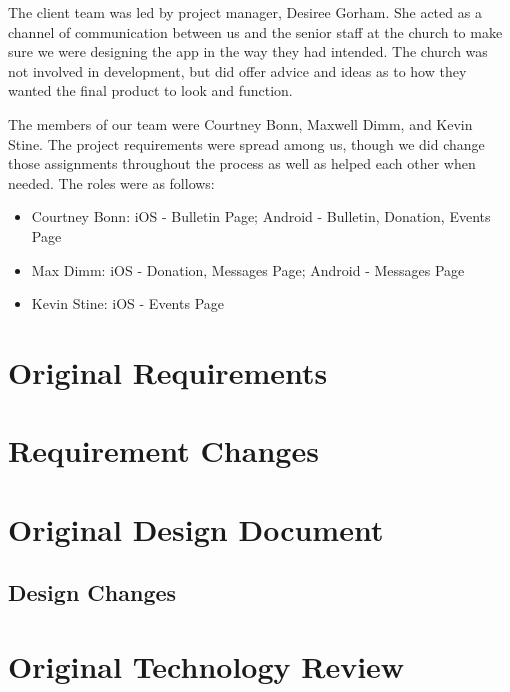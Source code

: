 \documentclass[letterpaper,10pt,draftclsnofoot,onecolumn,titlepage]{IEEEtran}
\begin{document}
The client team was led by project manager, Desiree Gorham. 
She acted as a channel of communication between us and the senior staff at the church to make sure we were designing the app in the way they had intended. 
The church was not involved in development, but did offer advice and ideas as to how they wanted the final product to look and function. 

The members of our team were Courtney Bonn, Maxwell Dimm, and Kevin Stine. 
The project requirements were spread among us, though we did change those assignments throughout the process as well as helped each other when needed. 
The roles were as follows: 

\begin{itemize}
	\item Courtney Bonn: iOS - Bulletin Page; Android - Bulletin, Donation, Events Page
	\item Max Dimm: iOS - Donation, Messages Page; Android - Messages Page
	\item Kevin Stine: iOS - Events Page
\end{itemize}

\section{Original Requirements}

	

\section{Requirement Changes}

\section{Original Design Document}

	
	
	\subsection{Design Changes}
	
\section{Original Technology Review}

	
\end{document}
